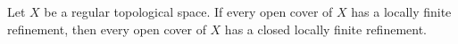 Let $X$ be a regular topological space. If every open cover of $X$ has a locally finite refinement, then every open cover of $X$ has a closed locally finite refinement.

